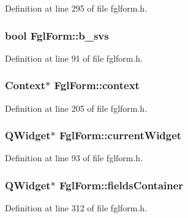 Definition at line 295 of file fglform.h.

\hypertarget{classFglForm_a8c411d93b67981a684a5cf6b67111dc1}{
\subsubsection[{b\_\-svs}]{\setlength{\rightskip}{0pt plus 5cm}bool {\bf FglForm::b\_\-svs}}}
\label{classFglForm_a8c411d93b67981a684a5cf6b67111dc1}


Definition at line 91 of file fglform.h.

\hypertarget{classFglForm_ad88a7b19b295fe1f14de652a9e3e1c17}{
\subsubsection[{context}]{\setlength{\rightskip}{0pt plus 5cm}Context$\ast$ {\bf FglForm::context}}}
\label{classFglForm_ad88a7b19b295fe1f14de652a9e3e1c17}


Definition at line 205 of file fglform.h.

\hypertarget{classFglForm_abce220040f982717756bfc10b51dac44}{
\subsubsection[{currentWidget}]{\setlength{\rightskip}{0pt plus 5cm}QWidget$\ast$ {\bf FglForm::currentWidget}}}
\label{classFglForm_abce220040f982717756bfc10b51dac44}


Definition at line 93 of file fglform.h.

\hypertarget{classFglForm_a67c8174c2d61e69e76c3206766fe3ac9}{
\subsubsection[{fieldsContainer}]{\setlength{\rightskip}{0pt plus 5cm}QWidget$\ast$ {\bf FglForm::fieldsContainer}}}
\label{classFglForm_a67c8174c2d61e69e76c3206766fe3ac9}


Definition at line 312 of file fglform.h.

